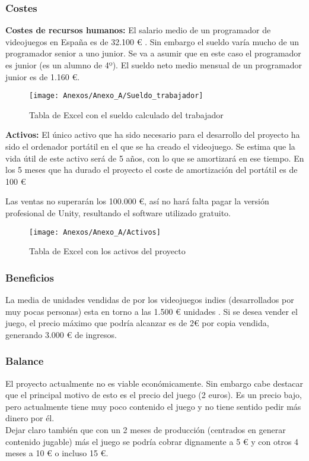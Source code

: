 \subsubsection{Costes}
\textbf{Costes de recursos humanos:}
El salario medio de un programador de videojuegos en España es de 32.100 € \cite{Sueldo}. Sin embargo el sueldo varía mucho de un programador senior a uno junior. Se va a asumir que en este caso el programador es junior (es un alumno de 4º). El sueldo neto medio mensual de un programador junior es de 1.160 €.

\begin{figure}[h]
\centering
\texttt{[image: Anexos/Anexo\_A/Sueldo\_trabajador]}
\caption{Tabla de Excel con el sueldo calculado del trabajador}
\end{figure}

\textbf{Activos:}
El único activo que ha sido necesario para el desarrollo del proyecto ha sido el ordenador portátil en el que se ha creado el videojuego. Se estima que la vida útil de este activo será de 5 años, con lo que se amortizará en ese tiempo. En los 5 meses que ha durado el proyecto el coste de amortización del portátil es de 100 €

Las ventas no superarán los 100.000 €, así no hará falta pagar la versión profesional de Unity, resultando el software utilizado gratuito.

\begin{figure}[h]
\centering
\texttt{[image: Anexos/Anexo\_A/Activos]}
\caption{Tabla de Excel con los activos del proyecto}
\end{figure}

\subsubsection{Beneficios}
La media de unidades vendidas de por los videojuegos indies (desarrollados por muy pocas personas) esta en torno a las 1.500 € unidades \cite{Unidades}. Si se desea vender el juego, el precio máximo que podría alcanzar es de 2€ por copia vendida, generando 3.000 € de ingresos.

\subsubsection{Balance}
El proyecto actualmente no es viable económicamente. Sin embargo cabe destacar que el principal motivo de esto es el precio del juego (2 euros). Es un precio bajo, pero actualmente tiene muy poco contenido el juego y no tiene sentido pedir más dinero por él.\\
Dejar claro también que con un 2 meses de producción (centrados en generar contenido jugable) más el juego se podría cobrar dignamente a 5 € y con otros 4 meses a 10 € o incluso 15 €.

